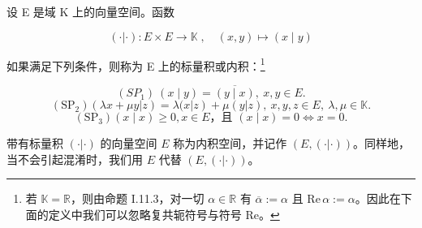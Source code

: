 
设 E 是域 K 上的向量空间。函数

\begin{equation}
(\cdot|\cdot)\colon E\times E\to\mathbb{K}\;,\quad(x,y)\mapsto(x\mid y)
\end{equation}

如果满足下列条件，则称为 E 上的标量积或内积：\footnote{若 $\mathbb K=\mathbb R$，则由命题 I.11.3，对一切 $\alpha\in\mathbb R$ 有 $\overline{\alpha}:=\alpha$ 且 $\mathrm{Re}\,\alpha:=\alpha$。因此在下面的定义中我们可以忽略复共轭符号与符号 Re。}

\[
\left(SP_{1}\right)\ \left(x\mid y\right)=\overline{\left(y\mid x\right)},\ x,y\in E.
\]
\[
\left(\mathrm{SP}_{2}\right)\left(\lambda x+\mu y\left|z\right.\right)=\lambda(x\left|z\right)+\mu(y\left|z\right.),\ x,y,z\in E,\ \lambda,\mu\in\mathbb{K}.
\]
\[
\left(\mathrm{SP}_{3}\right)\left(x\mid x\right)\geq0,x\in E\text{，且 }\left(x\mid x\right)=0\Longleftrightarrow x=0.
\]

带有标量积 $(\cdot|\cdot)$ 的向量空间 $E$ 称为内积空间，并记作 $(E,(\cdot|\cdot))$。同样地，当不会引起混淆时，我们用 $E$ 代替 $(E,(\cdot|\cdot))$。

